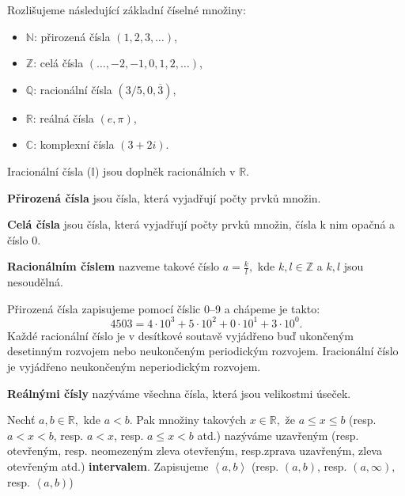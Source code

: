 \begin{pozn}
  Rozlišujeme následující základní číselné množiny:
  \begin{itemize}
    \item $\mathbb{N}$: přirozená čísla $(1, 2, 3, \dots)$,
    \item $\mathbb{Z}$: celá čísla $(\dots, -2, -1, 0, 1, 2, \dots)$,
    \item $\mathbb{Q}$: racionální čísla $(3/5, 0,\overline{3})$,
    \item $\mathbb{R}$: reálná čísla $(e, \pi)$,
    \item $\mathbb{C}$: komplexní čísla $(3+2i)$.
  \end{itemize}
\end{pozn}

Iracionální čísla ($\mathbb{I}$) jsou doplněk racionálních v $\mathbb{R}$.

\begin{definition}
  \textbf{Přirozená čísla} jsou čísla, která vyjadřují počty prvků množin.
\end{definition}

\begin{definition}
  \textbf{Celá čísla} jsou čísla, která vyjadřují počty prvků množin, čísla k nim opačná a číslo 0.
\end{definition}

\begin{definition}
  \textbf{Racionálním číslem} nazveme takové číslo $a = \frac{k}{l},$ kde $ k, l \in \mathbb{Z}$ a $k,l$ jsou nesoudělná.
\end{definition}

\begin{pozn}
  Přirozená čísla zapisujeme pomocí číslic 0--9 a chápeme je takto:
  $$4503=4\cdot 10^3+5\cdot 10^2 + 0 \cdot 10^1 + 3\cdot 10^0.$$
  Každé racionální číslo je v desítkové soutavě vyjádřeno buď ukončeným desetinným rozvojem nebo neukončeným periodickým rozvojem. Iracionální číslo je vyjádřeno neukončeným neperiodickým rozvojem.
\end{pozn}

\begin{definition}
  \textbf{Reálnými čísly} nazýváme všechna čísla, která jsou velikostmi úseček.
\end{definition}

\begin{definition}
  Nechť $a,b \in \mathbb{R},$ kde $a<b$. Pak množiny takových $x\in \mathbb{R},$ že $a\leq x\leq b$ (resp. $a < x < b$, resp. $a < x$, resp. $a \leq x < b$ atd.) nazýváme uzavřeným (resp. otevřeným, resp. neomezeným zleva otevřeným, resp.zprava uzavřeným, zleva otevřeným atd.) \textbf{intervalem}. Zapisujeme $\left<a,b\right>$ (resp. $\left(a,b\right)$, resp. $(a, \infty)$, resp. $\left<a, b\right)$)
\end{definition}

